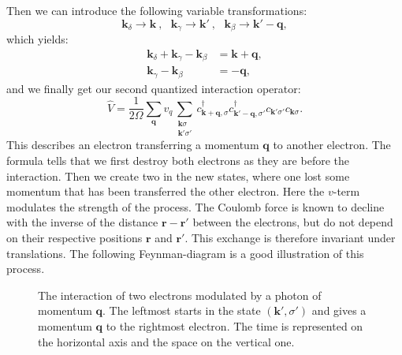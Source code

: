 \documentclass[../main.tex]{subfile}
\begin{document}
Then we can introduce the following variable transformations:
\[
    \bm{k}_{\delta} \rightarrow \bm{k} ~,~~~ \bm{k}_{\gamma} \rightarrow \bm{k}' ~,~~~ \bm{k}_{\beta} \rightarrow \bm{k}' - \bm{q},
\]
which yields:
\begin{align*}
    \bm{k}_{\delta} + \bm{k}_{\gamma} - \bm{k}_{\beta} &= \bm{k}+ \bm{q},\\
    \bm{k}_{\gamma} - \bm{k}_{\beta} &=  -\bm{q},
\end{align*}
and we finally get our second quantized interaction operator:
\[
    \hat{V} = \frac{1}{2\Omega} \sum_{\bm{q}}v_{q} \sum_{\substack{\bm{k}\sigma\\\bm{k}'\sigma'}} c^{\dagger}_{\bm{k}+\bm{q},\sigma}c^{\dagger}_{\bm{k}'-\bm{q},\sigma'}c_{\bm{k}'\sigma'}c_{\bm{k}\sigma}.
\]
This describes an electron transferring a momentum $\bm{q}$ to another electron. The formula tells that we first destroy both electrons as they are before the interaction.
Then we create two in the new states, where one lost some momentum that has been transferred the other electron. Here the $v$-term modulates the strength of the process. 
The Coulomb force is known to decline with the inverse of the distance $\bm{r}-\bm{r}'$
between the electrons, but do not depend on their respective positions $\bm{r}$ and $\bm{r}'$. This exchange is therefore invariant under translations.
The following Feynman-diagram is a good illustration of this process.\\
\begin{figure}[H]
    \centering

    \caption{The interaction of two electrons modulated by a photon of momentum $\bm{q}$. The leftmost starts in the state  $(\bm{k}', \sigma')$ and gives 
    a momentum $\bm{q}$ to the rightmost electron. The time is represented on the horizontal axis and the space on the vertical one.}
    \label{fig:photon_exchange}
\end{figure}
\end{document}
